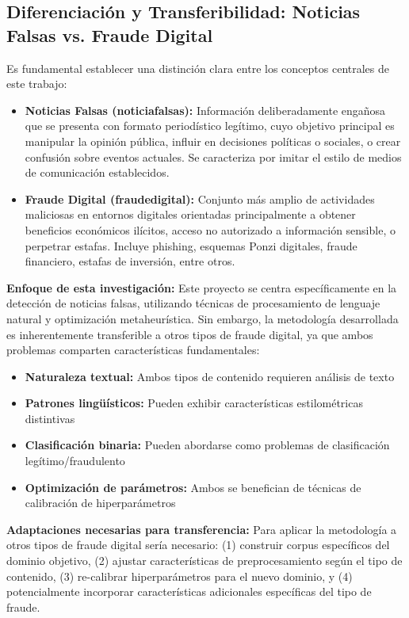 \subsection{Diferenciación y Transferibilidad: Noticias Falsas vs. Fraude Digital}

Es fundamental establecer una distinción clara entre los conceptos centrales de este trabajo:

\begin{itemize}
    \item \textbf{Noticias Falsas (\glspl{noticiafalsa}):} Información deliberadamente engañosa que se presenta con formato periodístico legítimo, cuyo objetivo principal es manipular la opinión pública, influir en decisiones políticas o sociales, o crear confusión sobre eventos actuales. Se caracteriza por imitar el estilo de medios de comunicación establecidos.

    \item \textbf{Fraude Digital (\gls{fraudedigital}):} Conjunto más amplio de actividades maliciosas en entornos digitales orientadas principalmente a obtener beneficios económicos ilícitos, acceso no autorizado a información sensible, o perpetrar estafas. Incluye phishing, esquemas Ponzi digitales, fraude financiero, estafas de inversión, entre otros.
\end{itemize}

\textbf{Enfoque de esta investigación:} Este proyecto se centra específicamente en la detección de noticias falsas, utilizando técnicas de procesamiento de lenguaje natural y optimización metaheurística. Sin embargo, la metodología desarrollada es inherentemente transferible a otros tipos de fraude digital, ya que ambos problemas comparten características fundamentales:

\begin{itemize}
    \item \textbf{Naturaleza textual:} Ambos tipos de contenido requieren análisis de texto
    \item \textbf{Patrones lingüísticos:} Pueden exhibir características estilométricas distintivas
    \item \textbf{Clasificación binaria:} Pueden abordarse como problemas de clasificación legítimo/fraudulento
    \item \textbf{Optimización de parámetros:} Ambos se benefician de técnicas de calibración de hiperparámetros
\end{itemize}

\textbf{Adaptaciones necesarias para transferencia:} Para aplicar la metodología a otros tipos de fraude digital sería necesario: (1) construir corpus específicos del dominio objetivo, (2) ajustar características de preprocesamiento según el tipo de contenido, (3) re-calibrar hiperparámetros para el nuevo dominio, y (4) potencialmente incorporar características adicionales específicas del tipo de fraude.

